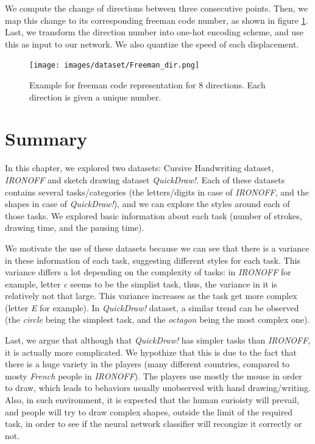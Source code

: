     \par We compute the change of directions between three consecutive points. Then, we map this change to its corresponding freeman code number, as shown in figure \ref{fig:freeman_dir}. Last, we transform the direction number into one-hot encoding scheme, and use this as input to our network. We also quantize the speed of each displacement.

    \begin{figure}[htbp!]
    \centering
    \texttt{[image: images/dataset/Freeman\_dir.png]}
    \caption{Example for freeman code representation for 8 directions. Each direction is given a unique number.}
    \label{fig:freeman_dir}
    \end{figure}

\section{Summary}
  \par In this chapter, we explored two datasets: Cursive Handwriting dataset, \textit{IRONOFF} and sketch drawing dataset \textit{QuickDraw!}. Each of these datasets contains several tasks/categories (the letters/digits in case of \textit{IRONOFF}, and the shapes in case of \textit{QuickDraw!}), and we can explore the styles around each of those tasks. We explored basic information about each task (number of strokes, drawing time, and the pausing time).

  \par We motivate the use of these datasets because we can see that there is a variance in these information of each task, suggesting different styles for each task. This variance differs a lot depending on the complexity of tasks: in \textit{IRONOFF} for example, letter \textit{c} seems to be the simplist task, thus, the variance in it is relatively not that large. This variance increases as the task get more complex (letter \textit{E} for example). In \textit{QuickDraw!} dataset, a similar trend can be observed (the \textit{circle} being the simplest task, and the \textit{octagon} being the most complex one).

  \par Last, we argue that although that \textit{QuickDraw!} has simpler tasks than \textit{IRONOFF}, it is actually more complicated. We hypothize that this is due to the fact that there is a huge variety in the players (many different countries, compared to mosty \textit{French} people in \textit{IRONOFF}). The players use mostly the mouse in order to draw, which leads to behaviors usually unobserved with hand drawing/writing. Also, in such environment, it is expected that the human curioisty will prevail, and people will try to draw complex shapes, outside the limit of the required task, in order to see if the neural network classifier will recongize it correctly or not.

